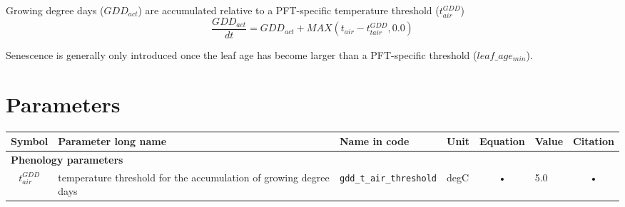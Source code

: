 Growing degree days ($GDD_{act}$) are accumulated relative to a PFT-specific temperature threshold ($t_{air}^{GDD}$) 
\begin{equation}\label{eq:gdd}
\frac{GDD_{act}}{dt} = GDD_{act} + MAX(t_{air} - t_{tair}^{GDD},0.0)
\end{equation}

Senescence is generally only introduced once the leaf age has become larger than a PFT-specific threshold ($leaf\_age_{min}$). 



\begin{table}
\section{Parameters}\label{tab:pheno:param}

\begin{tabularx}{\linewidth}{|c|X|l|l|c|X|c|} %
\hline 
Symbol & Parameter long name & Name in code & Unit & Equation & Value & Citation \\ 
\hline 
\multicolumn{6}{l}{\bf Phenology parameters}\\
\hline
$t_{air}^{GDD}$ & temperature threshold for the accumulation of growing degree days & \texttt{gdd\_t\_air\_threshold} & degC & • & 5.0 & • \\
\hline 
\end{tabularx}
\end{table}



\pagebreak

\newpage
